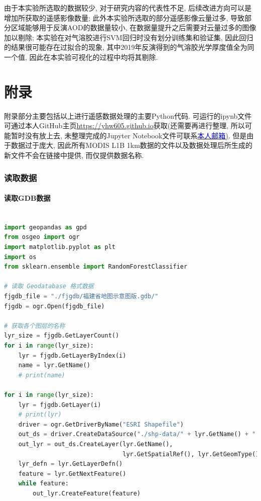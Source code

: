 \documentclass{ctexart}
\begin{document}
\begin{sloppypar}
由于本实验所选取的数据较少, 对于研究内容的代表性不足, 后续改进方向可以是增加所获取的遥感影像数量; 
此外本实验所选取的部分遥感影像云量过多, 导致部分区域能够用于反演AOD的数据量较小, 在数据量提升之后需要对云量过多的图像加以剔除;
本实验在对气溶胶进行SVM回归时没有划分训练集和验证集, 因此回归的结果很可能存在过拟合的现象, 其中2019年反演得到的气溶胶光学厚度值全为同一个值, 因此在本实验可视化的过程中均将其剔除.




\part*{附录}\label{appendices}
附录部分主要包括以上进行遥感数据处理的主要Python代码.
可运行的ipynb文件可通过本人GitHub主页\textcolor{blue}{\href{https://yhw605.github.io}{https://yhw605.github.io}}获取(还需要再进行整理, 所以可能暂时没有放上去, 未整理完成的Jupyter Notebook文件可联系\href{mailto:hanwen_yan@outlook.com}{\textcolor{blue}{本人邮箱})}. 但是由于数据过于庞大, 因此所有MODIS L1B 1km数据的文件以及数据处理后所生成的新文件不会在链接中提供, 而仅提供数据名称.
\begin{appendices}

\section{读取数据}
\subsection{读取GDB数据}\label{readgdb}
\begin{lstlisting}[frame=single, basicstyle={\ttfamily}, language = Python, caption={读取GDB并输出为shp}, label = {out}]

import geopandas as gpd
from osgeo import ogr
import matplotlib.pyplot as plt
import os
from sklearn.ensemble import RandomForestClassifier

# 读取 Geodatabase 格式数据
fjgdb_file = "./fjgdb/福建省地图示意图版.gdb/"
fjgdb = ogr.Open(fjgdb_file)

# 获取各个图层的名称
lyr_size = fjgdb.GetLayerCount()
for i in range(lyr_size):
    lyr = fjgdb.GetLayerByIndex(i)
    name = lyr.GetName()
    # print(name)
    
for i in range(lyr_size):
    lyr = fjgdb.GetLayer(i)
    # print(lyr)
    driver = ogr.GetDriverByName("ESRI Shapefile")
    out_ds = driver.CreateDataSource("./shp-data/" + lyr.GetName() + ".shp")
    out_lyr = out_ds.CreateLayer(lyr.GetName(), 
                                 lyr.GetSpatialRef(), lyr.GetGeomType())
    lyr_defn = lyr.GetLayerDefn()
    feature = lyr.GetNextFeature()
    while feature:
        out_lyr.CreateFeature(feature)
        

\end{lstlisting}
\end{appendices}
\end{sloppypar}
\end{document}

